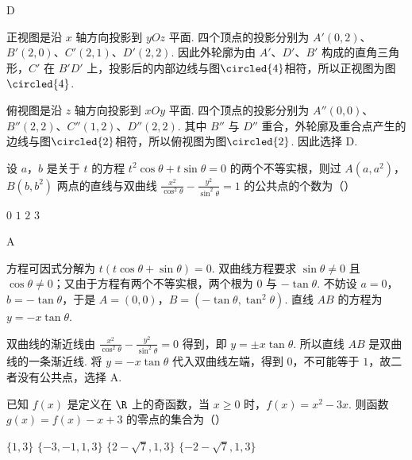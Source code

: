 \begin{answer}
D
\end{answer}

\begin{solution}
正视图是沿 \(x\) 轴方向投影到 \(yOz\) 平面. 四个顶点的投影分别为 \(A'(0,2)\)、\(B'(2,0)\)、\(C'(2,1)\)、\(D'(2,2)\).
因此外轮廓为由 \(A'\)、\(D'\)、\(B'\) 构成的直角三角形，\(C'\) 在 \(B'D'\) 上，投影后的内部边线与图\(\circled{4}\)相符，所以正视图为图\(\circled{4}\).

俯视图是沿 \(z\) 轴方向投影到 \(xOy\) 平面. 四个顶点的投影分别为 \(A''(0,0)\)、\(B''(2,2)\)、\(C''(1,2)\)、\(D''(2,2)\).
其中 \(B''\) 与 \(D''\) 重合，外轮廓及重合点产生的边线与图\(\circled{2}\)相符，所以俯视图为图\(\circled{2}\). 因此选择 D.
\end{solution}

\begin{problem}
设 \(a\)，\(b\) 是关于 \(t\) 的方程 \(t^2 \cos \theta + t \sin \theta = 0\) 的两个不等实根，则过 \(A(a, a^2)\)，\(B(b, b^2)\) 两点的直线与双曲线 \(\frac{x^2}{\cos^2 \theta} - \frac{y^2}{\sin^2 \theta} = 1\) 的公共点的个数为（\quad）

\choices
    {\(0\)}
    {\(1\)}
    {\(2\)}
    {\(3\)}
\end{problem}

\begin{answer}
A
\end{answer}

\begin{solution}
方程可因式分解为 \(t\left(t\cos\theta+\sin\theta\right)=0\).
双曲线方程要求 \(\sin\theta\neq0\) 且 \(\cos\theta\neq0\)；又由于方程有两个不等实根，两个根为 \(0\) 与 \(-\tan\theta\). 不妨设 \(a=0\)，\(b=-\tan\theta\)，于是
\(A=(0,0)\)，\(B=(-\tan\theta,\tan^2\theta)\).
直线 \(AB\) 的方程为 \(y=-x\tan\theta\).

双曲线的渐近线由 \(\frac{x^2}{\cos^2\theta}-\frac{y^2}{\sin^2\theta}=0\) 得到，即 \(y=\pm x\tan\theta\). 所以直线 \(AB\) 是双曲线的一条渐近线. 将 \(y=-x\tan\theta\) 代入双曲线左端，得到 \(0\)，不可能等于 \(1\)，故二者没有公共点，选择 A.
\end{solution}

\begin{problem}
已知 \( f(x) \) 是定义在 \(\R\) 上的奇函数，当 \( x \geqslant 0 \) 时，\( f(x) = x^2 - 3x \). 则函数 \( g(x) = f(x) - x + 3 \) 的零点的集合为（\quad）

\choices
    {\(\{1,3\}\)}
    {\(\{-3,-1,1,3\}\)}
    {\(\{2 - \sqrt{7}, 1, 3\}\)}
    {\(\{-2 - \sqrt{7}, 1, 3\}\)}
\end{problem}

